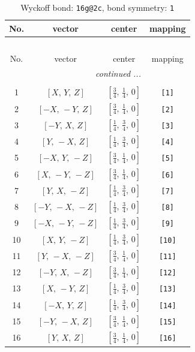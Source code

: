 \documentclass[fleqn,8pt]{jsarticle}
\begin{document}
\begin{longtable}{cccc}
\caption{Wyckoff bond: {\tt 16g@2c}, bond symmetry: {\tt 1}}
 \\
 \hline \hline
No. & vector & center & mapping \\ \hline \endfirsthead

\multicolumn{3}{l}{\tablename\ \thetable{}} \\
 \hline \hline
No. & vector & center & mapping \\ \hline \endhead

 \hline \hline
\multicolumn{3}{r}{\footnotesize\it continued ...} \\ \endfoot

 \hline \hline
\multicolumn{3}{r}{} \\ \endlastfoot

1 & $\left[ X,\, Y,\, Z \right]$ & $\left[ \frac{3}{4},\, \frac{1}{4},\, 0 \right]$ & {\tt [1]} \\ \hline
2 & $\left[ - X,\, - Y,\, Z \right]$ & $\left[ \frac{3}{4},\, \frac{1}{4},\, 0 \right]$ & {\tt [2]} \\ \hline
3 & $\left[ - Y,\, X,\, Z \right]$ & $\left[ \frac{1}{4},\, \frac{3}{4},\, 0 \right]$ & {\tt [3]} \\ \hline
4 & $\left[ Y,\, - X,\, Z \right]$ & $\left[ \frac{1}{4},\, \frac{3}{4},\, 0 \right]$ & {\tt [4]} \\ \hline
5 & $\left[ - X,\, Y,\, - Z \right]$ & $\left[ \frac{3}{4},\, \frac{1}{4},\, 0 \right]$ & {\tt [5]} \\ \hline
6 & $\left[ X,\, - Y,\, - Z \right]$ & $\left[ \frac{3}{4},\, \frac{1}{4},\, 0 \right]$ & {\tt [6]} \\ \hline
7 & $\left[ Y,\, X,\, - Z \right]$ & $\left[ \frac{1}{4},\, \frac{3}{4},\, 0 \right]$ & {\tt [7]} \\ \hline
8 & $\left[ - Y,\, - X,\, - Z \right]$ & $\left[ \frac{1}{4},\, \frac{3}{4},\, 0 \right]$ & {\tt [8]} \\ \hline
9 & $\left[ - X,\, - Y,\, - Z \right]$ & $\left[ \frac{1}{4},\, \frac{3}{4},\, 0 \right]$ & {\tt [9]} \\ \hline
10 & $\left[ X,\, Y,\, - Z \right]$ & $\left[ \frac{1}{4},\, \frac{3}{4},\, 0 \right]$ & {\tt [10]} \\ \hline
11 & $\left[ Y,\, - X,\, - Z \right]$ & $\left[ \frac{3}{4},\, \frac{1}{4},\, 0 \right]$ & {\tt [11]} \\ \hline
12 & $\left[ - Y,\, X,\, - Z \right]$ & $\left[ \frac{3}{4},\, \frac{1}{4},\, 0 \right]$ & {\tt [12]} \\ \hline
13 & $\left[ X,\, - Y,\, Z \right]$ & $\left[ \frac{1}{4},\, \frac{3}{4},\, 0 \right]$ & {\tt [13]} \\ \hline
14 & $\left[ - X,\, Y,\, Z \right]$ & $\left[ \frac{1}{4},\, \frac{3}{4},\, 0 \right]$ & {\tt [14]} \\ \hline
15 & $\left[ - Y,\, - X,\, Z \right]$ & $\left[ \frac{3}{4},\, \frac{1}{4},\, 0 \right]$ & {\tt [15]} \\ \hline
16 & $\left[ Y,\, X,\, Z \right]$ & $\left[ \frac{3}{4},\, \frac{1}{4},\, 0 \right]$ & {\tt [16]} \\
\end{longtable}
\end{document}

